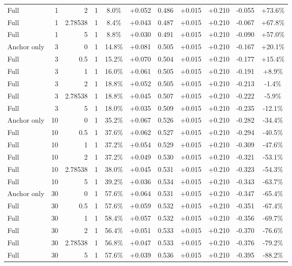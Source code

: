 \begin{table}[htbp]
\begin{tabular}{lrrrccccccc}
Full & 1 & 2 & 1 & 8.0\% & +0.052 & 0.486 & +0.015 & +0.210 & -0.055 & +73.6\% \\
Full & 1 & 2.78538 & 1 & 8.4\% & +0.043 & 0.487 & +0.015 & +0.210 & -0.067 & +67.8\% \\
Full & 1 & 5 & 1 & 8.8\% & +0.030 & 0.491 & +0.015 & +0.210 & -0.090 & +57.0\% \\
Anchor only & 3 & 0 & 1 & 14.8\% & +0.081 & 0.505 & +0.015 & +0.210 & -0.167 & +20.1\% \\
Full & 3 & 0.5 & 1 & 15.2\% & +0.070 & 0.504 & +0.015 & +0.210 & -0.177 & +15.4\% \\
Full & 3 & 1 & 1 & 16.0\% & +0.061 & 0.505 & +0.015 & +0.210 & -0.191 & +8.9\% \\
Full & 3 & 2 & 1 & 18.8\% & +0.052 & 0.505 & +0.015 & +0.210 & -0.213 & -1.4\% \\
Full & 3 & 2.78538 & 1 & 18.8\% & +0.045 & 0.507 & +0.015 & +0.210 & -0.222 & -5.9\% \\
Full & 3 & 5 & 1 & 18.0\% & +0.035 & 0.509 & +0.015 & +0.210 & -0.235 & -12.1\% \\
Anchor only & 10 & 0 & 1 & 35.2\% & +0.067 & 0.526 & +0.015 & +0.210 & -0.282 & -34.4\% \\
Full & 10 & 0.5 & 1 & 37.6\% & +0.062 & 0.527 & +0.015 & +0.210 & -0.294 & -40.5\% \\
Full & 10 & 1 & 1 & 37.2\% & +0.054 & 0.529 & +0.015 & +0.210 & -0.309 & -47.6\% \\
Full & 10 & 2 & 1 & 37.2\% & +0.049 & 0.530 & +0.015 & +0.210 & -0.321 & -53.1\% \\
Full & 10 & 2.78538 & 1 & 38.0\% & +0.045 & 0.531 & +0.015 & +0.210 & -0.323 & -54.3\% \\
Full & 10 & 5 & 1 & 39.2\% & +0.036 & 0.534 & +0.015 & +0.210 & -0.343 & -63.7\% \\
Anchor only & 30 & 0 & 1 & 57.6\% & +0.064 & 0.531 & +0.015 & +0.210 & -0.347 & -65.4\% \\
Full & 30 & 0.5 & 1 & 57.6\% & +0.059 & 0.532 & +0.015 & +0.210 & -0.351 & -67.4\% \\
Full & 30 & 1 & 1 & 58.4\% & +0.057 & 0.532 & +0.015 & +0.210 & -0.356 & -69.7\% \\
Full & 30 & 2 & 1 & 56.4\% & +0.051 & 0.533 & +0.015 & +0.210 & -0.370 & -76.6\% \\
Full & 30 & 2.78538 & 1 & 56.8\% & +0.047 & 0.533 & +0.015 & +0.210 & -0.376 & -79.2\% \\
Full & 30 & 5 & 1 & 57.6\% & +0.039 & 0.536 & +0.015 & +0.210 & -0.395 & -88.2\% \\

\end{tabular}
\end{table}
